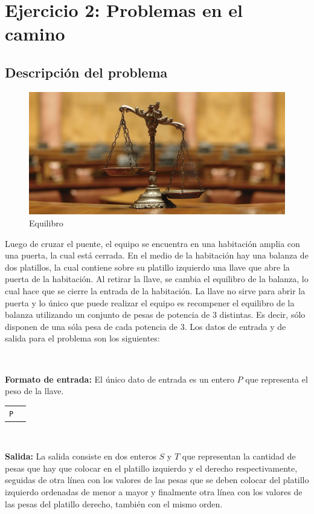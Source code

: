 
\section{Ejercicio 2: Problemas en el camino}
	\subsection{Descripción del problema}

	\begin{figure}[ht]
		\begin{center}
			\includegraphics[width=0.5\columnwidth]{imagenes/balanza.jpg}
			\caption{Equilibro}
		\end{center}
	\end{figure}

	Luego de cruzar el puente, el equipo se encuentra en una habitación amplia con una puerta, la cual está cerrada. En el medio de la habitación hay una balanza de dos platillos, la cual contiene sobre su platillo izquierdo una llave que abre la puerta de la habitación. Al retirar la llave, se cambia el equilibro de la balanza, lo cual hace que se cierre la entrada de la habitación. La llave no sirve para abrir la puerta y lo único que puede realizar el equipo es recompener el equilibro de la balanza utilizando un conjunto de pesas de potencia de 3 distintas. Es decir, sólo disponen de una sóla pesa de cada potencia de 3. Los datos de entrada y de salida para el problema son los siguientes: 

	~

	\textbf{Formato de entrada:} El único dato de entrada es un entero $P$ que representa el peso de la llave.

	\begin{tabular}{ll}
		\texttt{P}
	\end{tabular}

	~

	\textbf{Salida:} La salida consiste en dos enteros $S$ y $T$ que representan la cantidad de pesas que hay que colocar en el platillo izquierdo y el derecho respectivamente, seguidas de otra línea con los valores de las pesas que se deben colocar del platillo izquierdo ordenadas de menor a mayor y finalmente otra línea con los valores de las pesas del platillo derecho, también con el mismo orden.

